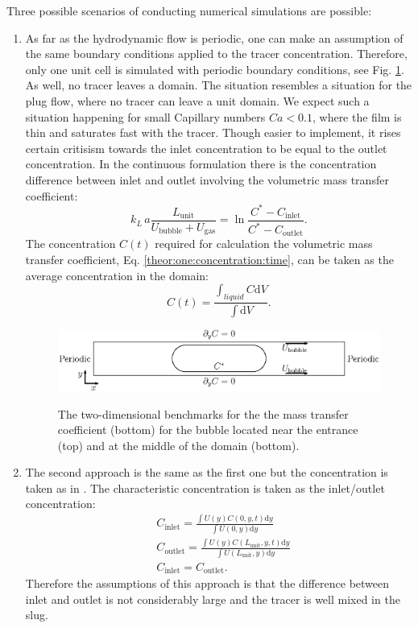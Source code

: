 \documentclass{article}
\newcommand{\beq}{\begin{equation}}
\newcommand{\feq}{\end{equation}}
\newcommand{\beqal}{\begin{equation}\begin{aligned}}
\newcommand{\feqal}{\end{aligned}\end{equation}}
\newcommand{\vol}{k_L\,a}
\newcommand{\lunit}{L_{\mathrm{unit}}}
\newcommand{\ububble}{U_{\mathrm{bubble}}}
\newcommand{\ugas}{U_{\mathrm{gas}}}
\newcommand{\cinlet}{C_{\mathrm{inlet}}}
\newcommand{\coutlet}{C_{\mathrm{outlet}}}
\newcommand{\cstar}{C^{*}}
\newcommand{\volnondim}{\vol \frac{\lunit}{\ububble+\ugas}}
\begin{document}
Three possible scenarios of conducting numerical simulations are possible: 
\begin{enumerate}
\item As far as the hydrodynamic flow is periodic, one can make an assumption of the same boundary
conditions applied to the tracer concentration. Therefore, only one unit cell is simulated with
periodic boundary conditions, see Fig. \ref{fig:benchmark}. As well, no tracer leaves a
domain. The situation resembles a situation for the plug flow, where no tracer can leave a unit
domain. We expect such a situation happening for small Capillary numbers $Ca<0.1$, where the film
is thin and saturates fast with the tracer. Though easier to implement, it rises certain critisism
towards the inlet concentration to be equal to the outlet concentration. In the continuous
formulation there is the concentration difference between inlet and outlet involving the volumetric
mass transfer coefficient:
\beq
\volnondim=\ln\frac{\cstar-\cinlet}{\cstar-\coutlet}.
\feq
The concentration $C(t)$ required for calculation the volumetric mass transfer coefficient, Eq.
\ref{theor:one:concentration:time}, can be taken as the average concentration in the domain:
\beq
\label{average:concentration:definition}
C(t)=\frac{\int_{liquid}{C \mathrm{d}V}}{\int{\mathrm{d}V}}.
\feq
\begin{figure}[htb!]
\includegraphics[width=\textwidth]{Figures/benchmark_middle.eps}\\
\caption{The two-dimensional benchmarks for the  the mass transfer
coefficient (bottom) for the bubble located near the entrance (top) and at the middle of the domain
(bottom). \label{fig:benchmark}}
\end{figure}
\item The second approach is the same as the first one but the concentration is taken as in
\cite{vanbaten-circular}. The characteristic concentration is taken as the inlet/outlet
concentration:
\beqal
&\cinlet=\frac{\int{U(y) C(0,y,t) \mathrm{d}y}}{\int{U(0,y) \mathrm{d}y}}\\
&\coutlet=\frac{\int{U(y) C(\lunit,y,t) \mathrm{d}y}}{\int{U(\lunit,y) \mathrm{d}y}}\\
&\cinlet=\coutlet.
\feqal
Therefore the assumptions  of this approach is that the difference between inlet and outlet is not
considerably large and the tracer is well mixed in the slug. 


\end{enumerate}
\end{document}
